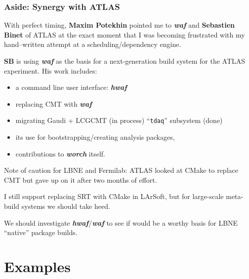 \documentclass[xcolor=dvipsnames]{beamer}
\newcommand{\app}[1]{\textbf{\textit{#1}}\xspace}
\def\waf{\app{waf}}
\def\hwaf{\app{hwaf}}
\def\worch{\app{worch}}
\begin{document}
\begin{frame}
  \frametitle{Aside: Synergy with ATLAS}
  
  With perfect timing, \textbf{Maxim Potekhin} pointed me to \waf and \textbf{Sebastien Binet} of
  ATLAS at the exact moment that I was becoming frustrated with my
  hand--written attempt at a scheduling/dependency engine.
  
  \textbf{SB} is using \waf as the basis for a next-generation build system for the ATLAS experiment.  His work includes: 
  \begin{itemize}
  \item a command line user interface: \hwaf
  \item replacing CMT with \waf
  \item migrating Gaudi + LCGCMT (in process) ``\texttt{tdaq}'' subsystem (done)
  \item its use for bootstrapping/creating analysis packages,
  \item contributions to \worch itself.
  \end{itemize}

  \vspace{5mm}
  Note of caution for LBNE and Fermilab: ATLAS looked at CMake to
  replace CMT but gave up on it after two months of effort.  

  I still support replacing SRT with CMake in LArSoft, but for
  large-scale meta-build systems we should take heed.

  We should investigate \hwaf/\waf to see if would be a worthy basis
  for LBNE ``native'' package builds.
\end{frame}

\section{Examples}
\end{document}

